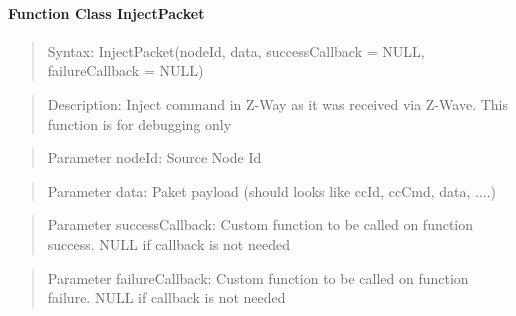 \paragraph{Function Class InjectPacket}
\begin{quote}Syntax: InjectPacket(nodeId, data, successCallback = NULL, failureCallback = NULL)\end{quote}
\begin{quote}Description: Inject command in Z-Way as it was received via Z-Wave. This function is for debugging only\end{quote}
\begin{quote}Parameter nodeId: Source Node Id\end{quote}
\begin{quote}Parameter data: Paket payload (should looks like ccId, ccCmd, data, ....)\end{quote}
\begin{quote}Parameter successCallback: Custom function to be called on function success. NULL if callback is not needed\end{quote}
\begin{quote}Parameter failureCallback: Custom function to be called on function failure. NULL if callback is not needed\end{quote}

